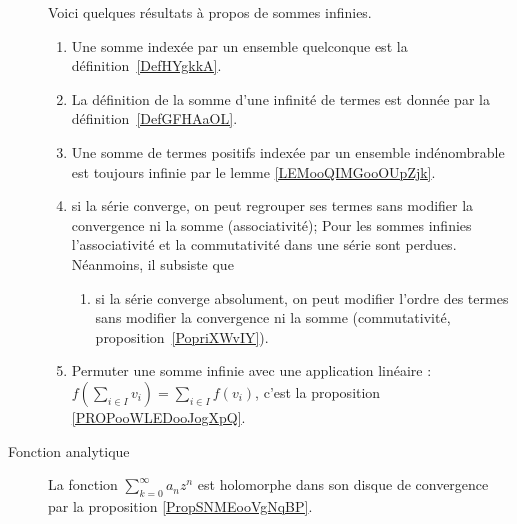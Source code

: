 \begin{description}
        Voici quelques résultats à propos de sommes infinies.%
        \begin{enumerate}
            \item
Une somme indexée par un ensemble quelconque est la définition~\ref{DefHYgkkA}.
    \item
        La définition de la somme d'une infinité de termes est donnée par la définition~\ref{DefGFHAaOL}.
    \item
        Une somme de termes positifs indexée par un ensemble indénombrable est toujours infinie par le lemme \ref{LEMooQIMGooOUpZjk}.
  \item
      si la série converge, on peut regrouper ses termes sans modifier la convergence ni la somme (associativité);
    Pour les sommes infinies l'associativité et la commutativité dans une série sont perdues. Néanmoins, il subsiste que
  \begin{enumerate}
  \item
      si la série converge absolument, on peut modifier l'ordre des termes sans modifier la convergence ni la somme (commutativité, proposition~\ref{PopriXWvIY}).
  \end{enumerate}
  \item Permuter une somme infinie avec une application linéaire : \( f(\sum_{i\in I}v_i)=\sum_{i\in I}f(v_i)\), c'est la proposition \ref{PROPooWLEDooJogXpQ}.
        \end{enumerate}
    \item[Fonction analytique]
        La fonction \( \sum_{k=0}^{\infty}a_nz^n\) est holomorphe dans son disque de convergence par la proposition \ref{PropSNMEooVgNqBP}.
\end{description}



